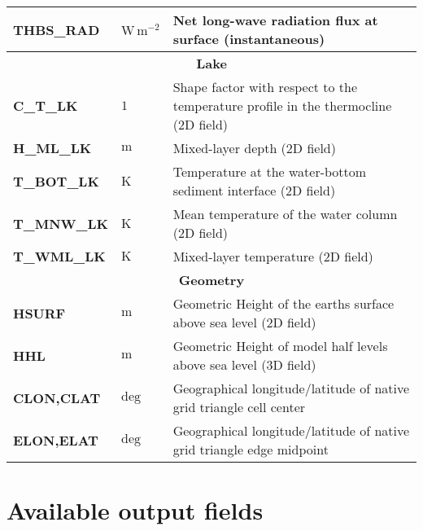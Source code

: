 \begin{longtable}{p{2.5cm}p{1.8cm}p{10.0cm}}
\textbf{THBS\_RAD}                      &  $\mathrm{W\,m^{-2}}$       &  Net long-wave radiation flux at surface (instantaneous) \\
%
\midrule
\multicolumn{3}{c}{\textbf{Lake}}\\
\midrule
\textbf{C\_T\_LK}                       &  $1$                        &  Shape factor with respect to the temperature profile in the thermocline (2D field)\\
\textbf{H\_ML\_LK}                      &  $\mathrm{m}$               &  Mixed-layer depth (2D field)\\
\textbf{T\_BOT\_LK}                     &  $\mathrm{K}$               &  Temperature at the water-bottom sediment interface (2D field)\\
\textbf{T\_MNW\_LK}                     &  $\mathrm{K}$               &  Mean temperature of the water column (2D field)\\
\textbf{T\_WML\_LK}                     &  $\mathrm{K}$               &  Mixed-layer temperature (2D field)\\
\midrule
\multicolumn{3}{c}{\textbf{Geometry}}\\
\midrule
\textbf{HSURF}                          &  $\mathrm{m}$               &  Geometric Height of the earths surface above sea level (2D field) \\
\textbf{HHL}                            &  $\mathrm{m}$               &  Geometric Height of model half levels above sea level (3D field) \\
\textbf{CLON,CLAT}                      &  $\mathrm{deg}$             &  Geographical longitude/latitude of native grid triangle cell center \\
\textbf{ELON,ELAT}                      &  $\mathrm{deg}$             &  Geographical longitude/latitude of native grid triangle edge midpoint \\
  \bottomrule
\end{longtable}


\section{Available output fields}\label{sec_outfields}

